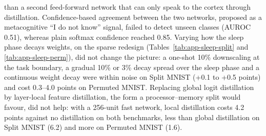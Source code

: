 \documentclass[11pt]{article}
\begin{document}
than a second feed-forward network that can only speak to the cortex through distillation. Confidence-based agreement between the two networks, proposed as a metacognitive ``I do not
know'' signal, failed to detect unseen classes (AUROC 0.51), whereas plain softmax confidence reached 0.85. Varying how the
sleep phase decays weights, on the sparse redesign (Tables~\ref{tab:app-sleep-split} and \ref{tab:app-sleep-perm}), did not
change the picture: a one-shot 10\% downscaling at the task boundary, a gradual 10\% or 3\% decay spread over the sleep
phase and a continuous weight decay were within noise on Split MNIST (+0.1 to +0.5 points) and cost 0.3--4.0 points on
Permuted MNIST. Replacing global logit distillation by layer-local feature distillation, the form a processor--memory split
would favour, did not help: with a 256-unit fast network, local distillation costs 4.2 points against no distillation on
both benchmarks, less than global distillation on Split MNIST (6.2) and more on Permuted MNIST (1.6).
\end{document}

